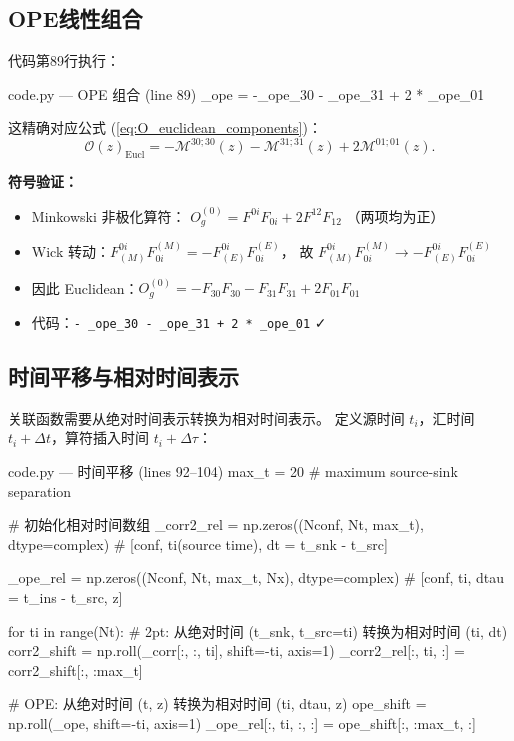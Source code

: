 \documentclass[12pt,a4paper]{ctexart}
\begin{document}
\subsection{OPE线性组合}

代码第89行执行：
\begin{codeblock}{code.py --- OPE 组合 (line 89)}
_ope = -_ope_30 - _ope_31 + 2 * _ope_01
\end{codeblock}

这精确对应公式 (\ref{eq:O_euclidean_components})：
\begin{equation*}
\mathcal{O}(z)_{\text{Eucl}} = -\mathcal{M}^{30;30}(z)
    - \mathcal{M}^{31;31}(z)
    + 2 \mathcal{M}^{01;01}(z).
\end{equation*}

\textbf{符号验证：}
\begin{itemize}
    \item Minkowski 非极化算符：
        $O_g^{(0)} = F^{0i}F_{0i} + 2F^{12}F_{12}$ （两项均为正）
    \item Wick 转动：$F^{0i}_{(M)}F^{(M)}_{0i} = -F^{0i}_{(E)}F^{(E)}_{0i}$，
        故 $F^{0i}_{(M)}F^{(M)}_{0i} \to -F^{0i}_{(E)}F^{(E)}_{0i}$
    \item 因此 Euclidean：$O_g^{(0)} = -F_{30}F_{30} - F_{31}F_{31} + 2F_{01}F_{01}$
    \item 代码：\texttt{- \_ope\_30 - \_ope\_31 + 2 * \_ope\_01} ✓
\end{itemize}

\subsection{时间平移与相对时间表示}

关联函数需要从绝对时间表示转换为相对时间表示。
定义源时间 $t_i$，汇时间 $t_i + \Delta t$，算符插入时间 $t_i + \Delta\tau$：

\begin{codeblock}{code.py --- 时间平移 (lines 92--104)}
max_t = 20  # maximum source-sink separation

# 初始化相对时间数组
_corr2_rel = np.zeros((Nconf, Nt, max_t), dtype=complex)
#  [conf, ti(source time), dt = t_snk - t_src]

_ope_rel = np.zeros((Nconf, Nt, max_t, Nx), dtype=complex)
#  [conf, ti, dtau = t_ins - t_src, z]

for ti in range(Nt):
    # 2pt: 从绝对时间 (t_snk, t_src=ti) 转换为相对时间 (ti, dt)
    corr2_shift = np.roll(_corr[:, :, ti], shift=-ti, axis=1)
    _corr2_rel[:, ti, :] = corr2_shift[:, :max_t]

    # OPE: 从绝对时间 (t, z) 转换为相对时间 (ti, dtau, z)
    ope_shift = np.roll(_ope, shift=-ti, axis=1)
    _ope_rel[:, ti, :, :] = ope_shift[:, :max_t, :]
\end{codeblock}
\end{document}
